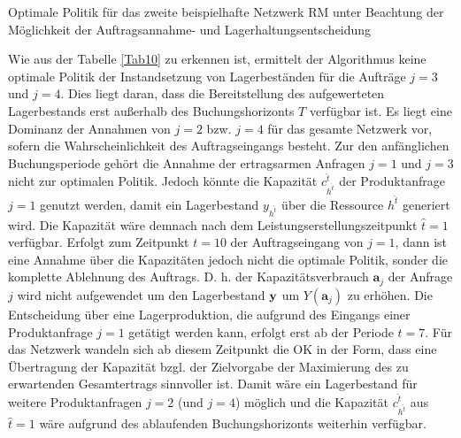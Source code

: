 \begin{table}
\begin{footnotesize}
     \caption{Optimale Politik für das zweite beispielhafte Netzwerk RM unter Beachtung der Möglichkeit der Auftragsannahme- und Lagerhaltungsentscheidung} \label{Tab10}
    \vspace*{3mm}
        \begin{center}
      \end{center}
    \begin{center}
      \end{center}
\end{footnotesize}
\end{table}

Wie aus der Tabelle \ref{Tab10} zu erkennen ist, ermittelt der Algorithmus keine optimale Politik der Instandsetzung von Lagerbeständen für die Aufträge $j=3$ und $j=4$. Dies liegt daran, dass die Bereitstellung des aufgewerteten Lagerbestands erst außerhalb des Buchungshorizonts $T$ verfügbar ist. Es liegt eine Dominanz der Annahmen von $j=2$ bzw. $j=4$ für das gesamte Netzwerk vor, sofern die Wahrscheinlichkeit des Auftragseingangs besteht. Zur den anfänglichen Buchungsperiode gehört die Annahme der ertragsarmen Anfragen $j=1$ und $j=3$ nicht zur optimalen Politik. Jedoch könnte die Kapazität $c_{h^{\hat t}}^{\hat t}$ der Produktanfrage $j=1$ genutzt werden, damit ein Lagerbestand $y_{h^{\hat t}}$ über die Ressource $h^{\hat t}$ generiert wird. Die Kapazität wäre demnach nach dem Leistungserstellungszeitpunkt $\hat{t}=1$ verfügbar. Erfolgt zum Zeitpunkt $t=10$ der Auftragseingang von $j=1$, dann ist eine Annahme über die Kapazitäten jedoch nicht die optimale Politik, sonder die komplette Ablehnung des Auftrags. D. h. der Kapazitätsverbrauch $\textbf{a}_j$ der Anfrage $j$ wird nicht aufgewendet um den Lagerbestand $\textbf y$ um $Y(\textbf{a}_j)$ zu erhöhen. Die Entscheidung über eine Lagerproduktion, die aufgrund des Eingangs einer Produktanfrage $j=1$ getätigt werden kann, erfolgt erst ab der Periode $t=7$. Für das Netzwerk wandeln sich ab diesem Zeitpunkt die OK in der Form, dass eine Übertragung der Kapazität bzgl. der Zielvorgabe der Maximierung des zu erwartenden Gesamtertrags sinnvoller ist. Damit wäre ein Lagerbestand für weitere Produktanfragen $j=2$ (und $j=4$) möglich und die Kapazität $c_{h^{\hat t}}^{\hat t}$ aus $\hat{t}=1$ wäre aufgrund des ablaufenden Buchungshorizonts weiterhin verfügbar.

